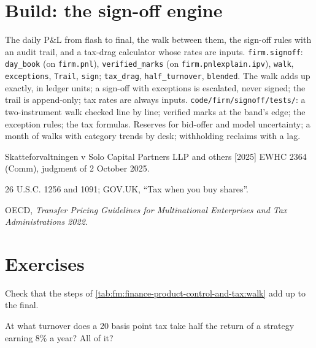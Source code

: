 \section{Build: the sign-off engine}\label{bld:fm:finance-product-control-and-tax:signoff}

\begin{build}
 The daily P\&L from flash to final, the walk between them, the sign-off rules with an audit trail, and a tax-drag calculator whose
rates are inputs.
 \texttt{firm.signoff}: \texttt{day\_book} (on \texttt{firm.pnl}), \texttt{verified\_marks} (on \texttt{firm.pnlexplain.ipv}),
\texttt{walk}, \texttt{exceptions}, \texttt{Trail}, \texttt{sign}; \texttt{tax\_drag}, \texttt{half\_turnover}, \texttt{blended}.
 The walk adds up exactly, in ledger units; a sign-off with exceptions is escalated, never signed; the trail is append-only; tax rates
are always inputs.
 \texttt{code/firm/signoff/tests/}: a two-instrument walk checked line by line; verified marks at the band's edge; the
exception rules; the tax formulas.
 Reserves for bid-offer and model uncertainty; a month of walks with category trends by desk; withholding reclaims with a lag.
\end{build}

\begin{omsources}
\item Skatteforvaltningen v Solo Capital Partners LLP and others [2025] EWHC 2364 (Comm), judgment of 2 October 2025.
\item 26 U.S.C. 1256 and 1091; GOV.UK, ``Tax when you buy shares''.
\item OECD, \emph{Transfer Pricing Guidelines for Multinational Enterprises and Tax Administrations 2022}.
\end{omsources}

\section{Exercises}

\begin{exercise}[$\star$]\label{exo:fm:finance-product-control-and-tax:1}
Check that the steps of \cref{tab:fm:finance-product-control-and-tax:walk} add up to the final.
\end{exercise}

\begin{exercise}[$\star$]\label{exo:fm:finance-product-control-and-tax:2}
At what turnover does a 20 basis point tax take half the return of a strategy earning 8\% a year? All of it?
\end{exercise}

